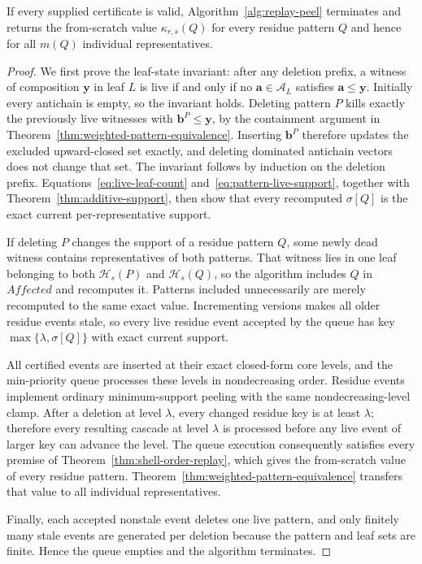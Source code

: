 \begin{theorem}
\label{thm:replay-peel-correctness}
If every supplied certificate is valid, Algorithm~\ref{alg:replay-peel} terminates and returns the from-scratch value $\kappa_{r,s}(Q)$ for every residue pattern $Q$ and hence for all $m(Q)$ individual representatives.
\end{theorem}
\begin{proof}
We first prove the leaf-state invariant: after any deletion prefix, a witness of composition $\mathbf y$ in leaf $L$ is live if and only if no $\mathbf a\in\mathcal A_L$ satisfies $\mathbf a\leq\mathbf y$.
%
Initially every antichain is empty, so the invariant holds.
%
Deleting pattern $P$ kills exactly the previously live witnesses with $\mathbf b^P\leq\mathbf y$, by the containment argument in Theorem~\ref{thm:weighted-pattern-equivalence}.
%
Inserting $\mathbf b^P$ therefore updates the excluded upward-closed set exactly, and deleting dominated antichain vectors does not change that set.
%
The invariant follows by induction on the deletion prefix.
%
Equations~\eqref{eq:live-leaf-count} and~\eqref{eq:pattern-live-support}, together with Theorem~\ref{thm:additive-support}, then show that every recomputed $\sigma[Q]$ is the exact current per-representative support.

If deleting $P$ changes the support of a residue pattern $Q$, some newly dead witness contains representatives of both patterns.
%
That witness lies in one leaf belonging to both $\mathcal H_s(P)$ and $\mathcal H_s(Q)$, so the algorithm includes $Q$ in $\mathit{Affected}$ and recomputes it.
%
Patterns included unnecessarily are merely recomputed to the same exact value.
%
Incrementing versions makes all older residue events stale, so every live residue event accepted by the queue has key $\max\{\lambda,\sigma[Q]\}$ with exact current support.

All certified events are inserted at their exact closed-form core levels, and the min-priority queue processes these levels in nondecreasing order.
%
Residue events implement ordinary minimum-support peeling with the same nondecreasing-level clamp.
%
After a deletion at level $\lambda$, every changed residue key is at least $\lambda$; therefore every resulting cascade at level $\lambda$ is processed before any live event of larger key can advance the level.
%
The queue execution consequently satisfies every premise of Theorem~\ref{thm:shell-order-replay}, which gives the from-scratch value of every residue pattern.
%
Theorem~\ref{thm:weighted-pattern-equivalence} transfers that value to all individual representatives.

Finally, each accepted nonstale event deletes one live pattern, and only finitely many stale events are generated per deletion because the pattern and leaf sets are finite.
%
Hence the queue empties and the algorithm terminates.
\end{proof}


